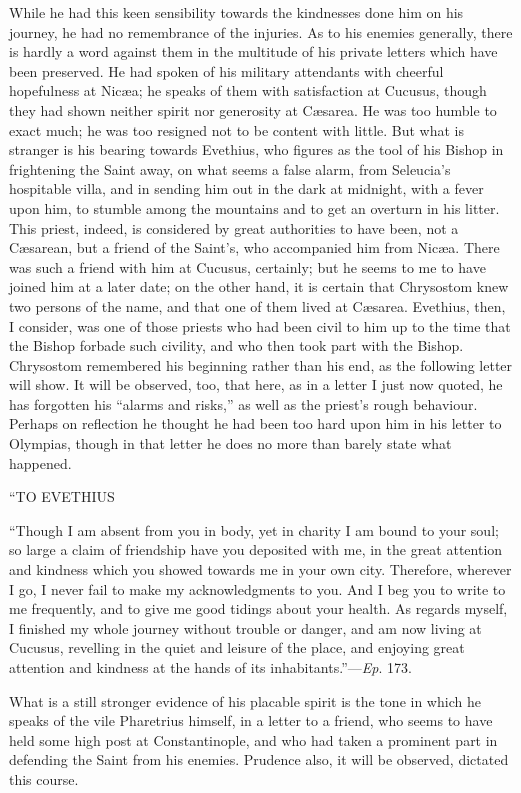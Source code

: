While he had this keen sensibility towards the kindnesses done him
on his journey, he had no remembrance of the injuries. As to his
enemies generally, there is hardly a word against them in the
multitude of his private letters which have been preserved. He had
spoken of his military attendants with cheerful hopefulness at Nicæa;
he speaks of them with satisfaction at Cucusus, though they had shown
neither spirit nor generosity at Cæsarea. He was too humble to exact
much; he was too resigned not to be content with little. But what is
stranger is his bearing towards Evethius, who figures as the tool of
his Bishop in frightening the Saint away, on what seems a false alarm,
from Seleucia's hospitable villa, and in sending him out in the dark
at midnight, with a fever upon him, to stumble among the mountains and
to get an overturn in his litter. This priest, indeed, is considered
by great authorities to have been, not a Cæsarean, but a friend of
the Saint's, who accompanied him from Nicæa. There was such a friend
with him at Cucusus, certainly; but he seems to me to have joined him
at a later date; on the other hand, it is certain that Chrysostom knew
two persons of the name, and that one of them lived at Cæsarea.
Evethius, then, I consider, was one of those priests who had been
civil to him up to the time that the Bishop forbade such civility, and
who then took part with the Bishop. Chrysostom remembered his
beginning rather than his end, as the following letter will
show. It will be observed, too, that here, as in a letter I just now
quoted, he has forgotten his ``alarms and risks,'' as well as
the priest's rough behaviour. Perhaps on reflection he thought he had
been too hard upon him in his letter to Olympias, though in that
letter he does no more than barely state what happened.

``TO
EVETHIUS

``Though I am absent from you in body, yet in charity I am
bound to your soul; so large a claim of friendship have you deposited
with me, in the great attention and kindness which you showed towards
me in your own city. Therefore, wherever I go, I never fail to make my
acknowledgments to you. And I beg you to write to me frequently, and
to give me good tidings about your health. As regards myself, I
finished my whole journey without trouble or danger, and am now living
at Cucusus, revelling in the quiet and leisure of the place, and
enjoying great attention and kindness at the hands of its
inhabitants.''—\emph{Ep}. 173.

What is a still stronger evidence of his placable spirit is the
tone in which he speaks of the vile Pharetrius himself, in a letter to
a friend, who seems to have held some high post at Constantinople, and
who had taken a prominent part in defending the Saint from his
enemies. Prudence also, it will be observed, dictated this course.

